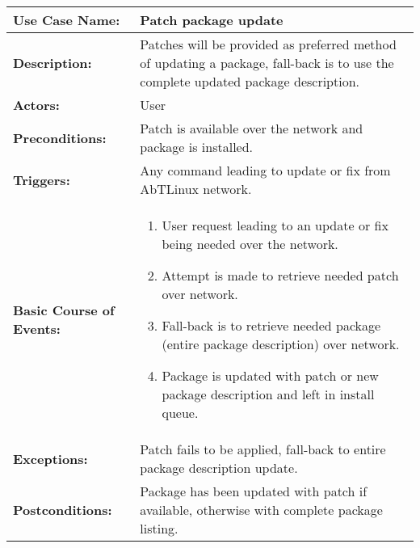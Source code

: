 
\begin{tabularx}{\linewidth}{|l|X|}
\hline
\textbf{Use Case Name:} & \textbf{Patch package update} \\
\hline
\textbf{Description:} & 
Patches will be provided as preferred method of updating a package, fall-back
is to use the complete updated package description. \\
\hline
\textbf{Actors:} & User \\
\hline
\textbf{Preconditions:} & 
Patch is available over the network and package is installed. \\
\hline
\textbf{Triggers:} & Any command leading to update or fix from AbTLinux network.  \\
\hline
\textbf{Basic Course of Events:} & 
\begin{minipage}{\linewidth} 
  \vspace{0.05em}
  \begin{enumerate}
    \item User request leading to an update or fix being needed over the network.
    \item Attempt is made to retrieve needed patch over network.
    \item Fall-back is to retrieve needed package (entire package description) over network.
    \item Package is updated with patch or new package description and left in install queue.
  \end{enumerate}
  \vspace{0.05em}
\end{minipage}
\\
\hline
\textbf{Exceptions:} & 
Patch fails to be applied, fall-back to entire package description update. \\
\hline 
\textbf{Postconditions:} &
Package has been updated with patch if available, otherwise with complete package listing.
\\
\hline
\end{tabularx}


